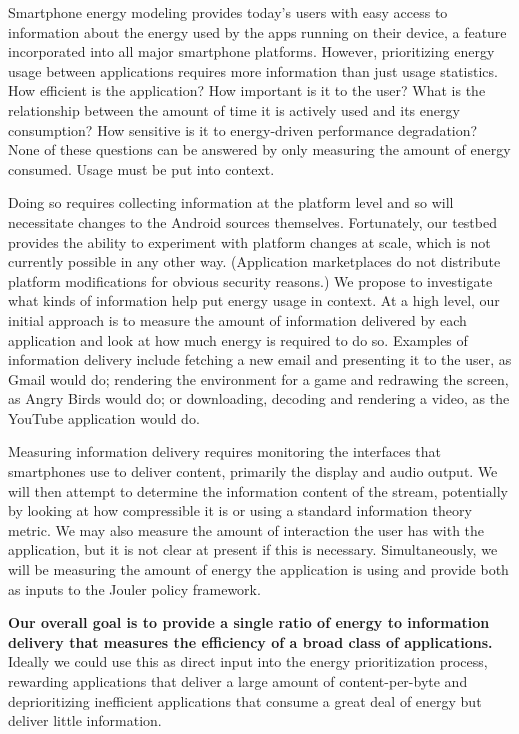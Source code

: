 Smartphone energy modeling provides today's users with easy access to
information about the energy used by the apps running on their device, a
feature incorporated into all major smartphone platforms. However,
prioritizing energy usage between applications requires more information than
just usage statistics. How efficient is the application? How important is it
to the user? What is the relationship between the amount of time it is
actively used and its energy consumption? How sensitive is it to
energy-driven performance degradation? None of these questions can be
answered by only measuring the amount of energy consumed. Usage must be put
into context.

Doing so requires collecting information at the platform level and so will
necessitate changes to the Android sources themselves. Fortunately, our
\PhoneLab{} testbed provides the ability to experiment with platform changes
at scale, which is not currently possible in any other way. (Application
marketplaces do not distribute platform modifications for obvious security
reasons.) We propose to investigate what kinds of information help put energy
usage in context. At a high level, our initial approach is to measure the
amount of information delivered by each application and look at how much
energy is required to do so. Examples of information delivery include
fetching a new email and presenting it to the user, as Gmail would do;
rendering the environment for a game and redrawing the screen, as Angry Birds
would do; or downloading, decoding and rendering a video, as the YouTube
application would do.

Measuring information delivery requires monitoring the interfaces that
smartphones use to deliver content, primarily the display and audio output.
We will then attempt to determine the information content of the stream,
potentially by looking at how compressible it is or using a standard
information theory metric. We may also measure the amount of interaction the
user has with the application, but it is not clear at present if this is
necessary. Simultaneously, we will be measuring the amount of energy the
application is using and provide both as inputs to the Jouler policy
framework. 

\textbf{Our overall goal is to provide a single ratio of energy to
information delivery that measures the efficiency of a broad class of
applications.} Ideally we could use this as direct input into the energy
prioritization process, rewarding applications that deliver a large amount of
content-per-byte and deprioritizing inefficient applications that consume a
great deal of energy but deliver little information.

